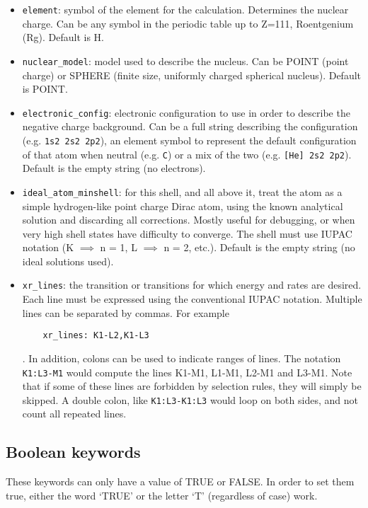 \documentclass[]{article}
\begin{document}
\begin{itemize}
	\item \texttt{element}: symbol of the element for the calculation. Determines the nuclear charge. Can be any symbol in the periodic table up to Z=111, Roentgenium (Rg). Default is H.
	\item \texttt{nuclear\_model}: model used to describe the nucleus. Can be POINT (point charge) or SPHERE (finite size, uniformly charged spherical nucleus). Default is POINT.
	\item \texttt{electronic\_config}: electronic configuration to use in order to describe the negative charge background. Can be a full string describing the configuration (e.g. \texttt{1s2 2s2 2p2}), an element symbol to represent the default configuration of that atom when neutral (e.g. \texttt{C}) or a mix of the two (e.g. \texttt{[He] 2s2 2p2}). Default is the empty string (no electrons).
    \item \texttt{ideal\_atom\_minshell}: for this shell, and all above it, treat the atom as a simple hydrogen-like point charge Dirac atom, using the known analytical solution and discarding all corrections. Mostly useful for debugging, or when very high shell states have difficulty to converge. The shell must use IUPAC notation (K $\implies$ n = 1, L $\implies$ n = 2, etc.). Default is the empty string (no ideal solutions used).
    \item \texttt{xr\_lines}: the transition or transitions for which energy and rates are desired. Each line must be expressed using the conventional IUPAC notation. Multiple lines can be separated by commas. For example
	
	\begin{verbatim}
	xr_lines: K1-L2,K1-L3
	\end{verbatim}
	
	. In addition, colons can be used to indicate ranges of lines. The notation \texttt{K1:L3-M1} would compute the lines K1-M1, L1-M1, L2-M1 and L3-M1. Note that if some of these lines are forbidden by selection rules, they will simply be skipped. A double colon, like \texttt{K1:L3-K1:L3} would loop on both sides, and not count all repeated lines. 
\end{itemize}

\subsection{Boolean keywords}

These keywords can only have a value of TRUE or FALSE. In order to set them true, either the word `TRUE' or the letter `T' (regardless of case) work.
\end{document}
